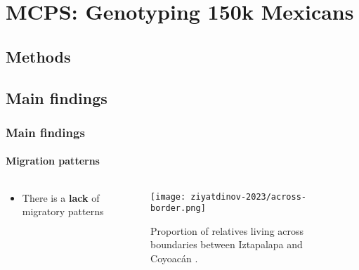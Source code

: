 
% 

\section{MCPS: Genotyping 150k Mexicans}

\subsection{Methods}

\subsection{Main findings}

\begin{frame}
    \frametitle{Main findings}
    \framesubtitle{Migration patterns}

    \begin{columns}
    
    \begin{column}{0.5\textwidth}

       \begin{itemize}[noitemsep,topsep=0pt]
            \item There is a \textbf{\color{complement-1} lack} of migratory patterns
       \end{itemize} 
    \end{column}
    
    \begin{column}{0.5\textwidth}
        \begin{figure}[htpb]
            \centering
            \texttt{[image: ziyatdinov-2023/across-border.png]}
            \caption{Proportion of relatives living across boundaries between Iztapalapa and Coyoacán \parencite{ziyatdinov2023}.}
            \label{fig:cross-border}
        \end{figure}
    \end{column}
    
    \end{columns}
    
\end{frame}

